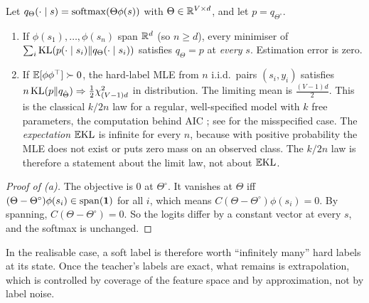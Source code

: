 \begin{proposition}\label{prop:exact}
Let $q_\Theta(\cdot\mid s)=\operatorname{softmax}(\Theta\phi(s))$ with $\Theta\in\mathbb{R}^{V\times d}$, and let $p=q_{\Theta^\circ}$.
\begin{enumerate}[label=(\alph*),nosep]
\item \Pv If $\phi(s_1),\dots,\phi(s_n)$ span $\mathbb{R}^d$ (so $n\ge d$), every minimiser of
$\sum_i\mathrm{KL}(p(\cdot\mid s_i)\|q_\Theta(\cdot\mid s_i))$ satisfies $q_\Theta=p$ at \emph{every} $s$.
Estimation error is zero.
\item \Kn If $\mathbb{E}[\phi\phi^\top]\succ0$, the hard-label MLE from $n$ i.i.d.\ pairs $(s_i,y_i)$ satisfies
$n\,\mathrm{KL}(p\|q_{\hat\Theta})\Rightarrow\frac12\chi^2_{(V-1)d}$ in distribution. The limiting mean is $\frac{(V-1)d}2$. This is the
classical $k/2n$ law for a regular, well-specified model with $k$ free parameters, the computation behind
AIC \citep{akaike1974new}; see \citet{white1982maximum} for the misspecified case. The \emph{expectation}
$\mathbb{E}\mathrm{KL}$ is infinite for every $n$, because with positive probability the MLE does not exist or puts zero
mass on an observed class. The $k/2n$ law is therefore a statement about the limit law, not about
$\mathbb{E}\mathrm{KL}$.
\end{enumerate}
\end{proposition}
\begin{proof}[Proof of (a)]
The objective is $0$ at $\Theta^\circ$. It vanishes at $\Theta$ iff $(\Theta-\Theta^\circ)\phi(s_i)\in\operatorname{span}(\mathbf{1})$
for all $i$, which means $C(\Theta-\Theta^\circ)\phi(s_i)=0$. By spanning, $C(\Theta-\Theta^\circ)=0$. So the
logits differ by a constant vector at every $s$, and the softmax is unchanged.
\end{proof}
\noindent
In the realisable case, a soft label is therefore worth ``infinitely many'' hard labels at its state.
Once the teacher's labels are exact, what remains is extrapolation, which is controlled by coverage of
the feature space and by approximation, not by label noise.


